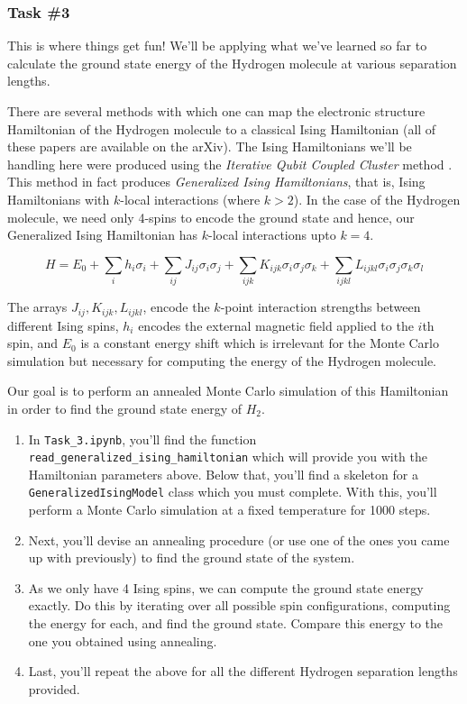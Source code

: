 \documentclass[12pt]{article}
\begin{document}
\subsubsection*{Task \#3}
This is where things get fun!
We'll be applying what we've learned so far to calculate the ground state energy
of the Hydrogen molecule at various separation lengths.

There are several methods with which one can map the electronic structure Hamiltonian
of the Hydrogen molecule to a classical Ising Hamiltonian
\cite{iqcc,qcc,xia2016electronic,xia2017electronic} (all of these papers are available on the arXiv).
The Ising Hamiltonians we'll be handling here were produced using the
\textit{Iterative Qubit Coupled Cluster} method \cite{iqcc}. This method
in fact produces \textit{Generalized Ising Hamiltonians}, that is, Ising
Hamiltonians with $k$-local interactions (where $k > 2$).
In the case of the Hydrogen molecule, we need only 4-spins to encode the ground state and
hence, our Generalized Ising Hamiltonian has $k$-local interactions upto $k=4$.

$$
H = E_0
+ \sum_{i} h_{i}\sigma_i
+ \sum_{ij} J_{ij}\sigma_i\sigma_j
+ \sum_{ijk} K_{ijk}\sigma_i\sigma_j\sigma_k
+ \sum_{ijkl} L_{ijkl}\sigma_i\sigma_j\sigma_k\sigma_l
$$

The arrays $J_{ij}, K_{ijk}, L_{ijkl}$, encode the $k$-point
interaction strengths between different Ising spins, $h_i$ encodes the
external magnetic field applied to the $i$th spin, and $E_0$ is a constant
energy shift which is irrelevant for the Monte Carlo simulation but
necessary for computing the energy of the Hydrogen molecule.

Our goal is to perform an annealed Monte Carlo simulation of this
Hamiltonian in order to find the ground state energy of $H_2$.

\begin{enumerate}
    \item In \texttt{Task\_3.ipynb}, you'll find the function \texttt{read\_generalized\_ising\_hamiltonian}
          which will provide you with the Hamiltonian parameters above. Below that, you'll
          find a skeleton for a \texttt{GeneralizedIsingModel} class which you must complete.
          With this, you'll perform a Monte Carlo simulation at a fixed temperature for 1000 steps.

    \item Next, you'll devise an annealing procedure (or use one of the ones you came up with previously)
          to find the ground state of the system.

    \item As we only have 4 Ising spins, we can compute the ground state energy exactly.
          Do this by iterating over all possible spin configurations, computing the energy
          for each, and find the ground state. Compare this energy to the one you obtained
          using annealing.

    \item Last, you'll repeat the above for all the different Hydrogen separation lengths provided.
\end{enumerate}
\end{document}
